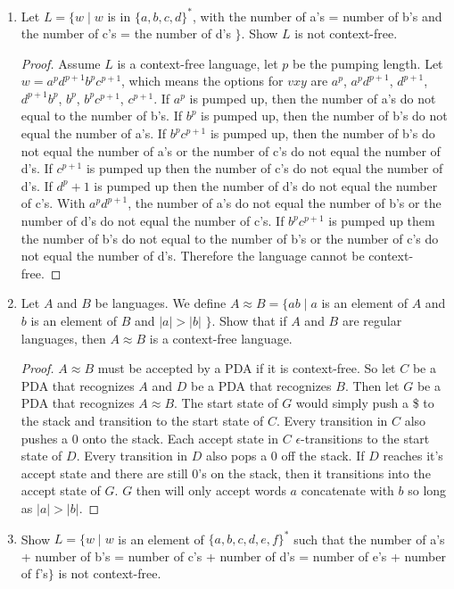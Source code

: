 \documentclass{article}
\begin{document}
\begin{enumerate}
\begin{proof}
            \end{proof}
        \item Let $L=\{w\mid w $ is in $\{a,b,c,d\}^*$, with the number of a's = number of b's and the number of c's = the number of d's $\}$. Show $L$ is not context-free.
            \begin{proof}
                Assume $L$ is a context-free language, let $p$ be the pumping length. Let $w=a^pd^{p+1}b^pc^{p+1}$, which means the options for $vxy$ are $a^p$, $a^pd^{p+1}$, $d^{p+1}$, $d^{p+1}b^p$, $b^p$, $b^pc^{p+1}$, $c^{p+1}$. If $a^p$ is pumped up, then the number of a's do not equal to the number of b's. If $b^p$ is pumped up, then the number of b's do not equal the number of a's. If $b^pc^{p+1}$ is pumped up, then the number of b's do not equal the number of a's or the number of c's do not equal the number of d's. If $c^{p+1}$ is pumped up then the number of c's do not equal the number of d's. If $d^p+1$ is pumped up then the number of d's do not equal the number of c's. With $a^pd^{p+1}$, the number of a's do not equal the number of b's or the number of d's do not equal the number of c's. If $b^pc^{p+1}$ is pumped up them the number of b's do not equal to the number of b's or the number of c's do not equal the number of d's. Therefore the language cannot be context-free.
            \end{proof}
        \item Let $A$ and $B$ be languages. We define $A\approx B = \{ab \mid a $ is an element of $A$ and $b$ is an element of $B$ and $|a| > |b|$ $\}$. Show that if $A$ and $B$ are regular languages, then $A\approx B$ is a context-free language.
            \begin{proof}
                $A\approx B$ must be accepted by a PDA if it is context-free. So let $C$ be a PDA that recognizes $A$ and $D$ be a PDA that recognizes $B$. Then let $G$ be a PDA that recognizes $A\approx B$. The start state of $G$ would simply push a \$ to the stack and transition to the start state of $C$. Every transition in $C$ also pushes a 0 onto the stack. Each accept state in $C$ $\epsilon$-transitions to the start state of $D$. Every transition in $D$ also pops a 0 off the stack. If $D$ reaches it's accept state and there are still 0's on the stack, then it transitions into the accept state of $G$. $G$ then will only accept words $a$ concatenate with $b$ so long as $|a|>|b|$.
            \end{proof}
        \item Show $L = \{w\mid w $ is an element of $\{a,b,c,d,e,f\}^*$ such that the number of a's + number of b's = number of c's + number of d's = number of e's + number of f's$ \}$ is not context-free.

\end{enumerate}
\end{document}
